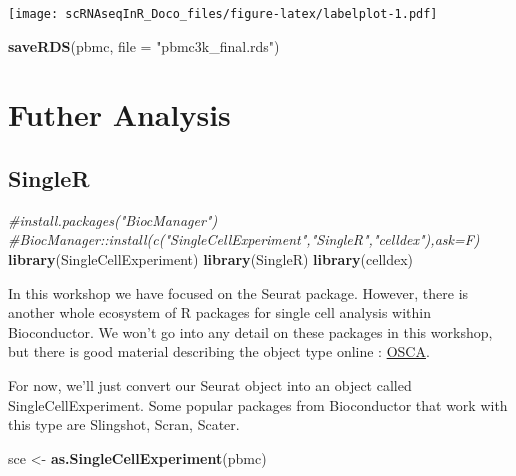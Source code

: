 \documentclass[
]{book}
\newenvironment{Shaded}{\begin{snugshade}}{\end{snugshade}}
\newcommand{\AttributeTok}[1]{\textcolor[rgb]{0.13,0.29,0.53}{#1}}
\newcommand{\CommentTok}[1]{\textcolor[rgb]{0.56,0.35,0.01}{\textit{#1}}}
\newcommand{\FunctionTok}[1]{\textcolor[rgb]{0.13,0.29,0.53}{\textbf{#1}}}
\newcommand{\NormalTok}[1]{#1}
\newcommand{\OtherTok}[1]{\textcolor[rgb]{0.56,0.35,0.01}{#1}}
\newcommand{\StringTok}[1]{\textcolor[rgb]{0.31,0.60,0.02}{#1}}
\begin{document}
\texttt{[image: scRNAseqInR\_Doco\_files/figure-latex/labelplot-1.pdf]}

\begin{Shaded}
\begin{Highlighting}[]
\FunctionTok{saveRDS}\NormalTok{(pbmc, }\AttributeTok{file =} \StringTok{"pbmc3k\_final.rds"}\NormalTok{)}
\end{Highlighting}
\end{Shaded}

\hypertarget{part-futher-analysis}{%
\part{Futher Analysis}\label{part-futher-analysis}}

\hypertarget{singler}{%
\chapter{SingleR}\label{singler}}

\begin{Shaded}
\begin{Highlighting}[]
\CommentTok{\#install.packages("BiocManager")}
\CommentTok{\#BiocManager::install(c("SingleCellExperiment","SingleR","celldex"),ask=F)}
\FunctionTok{library}\NormalTok{(SingleCellExperiment)}
\FunctionTok{library}\NormalTok{(SingleR)}
\FunctionTok{library}\NormalTok{(celldex)}
\end{Highlighting}
\end{Shaded}

In this workshop we have focused on the Seurat package. However, there is another whole ecosystem of R packages for single cell analysis within Bioconductor. We won't go into any detail on these packages in this workshop, but there is good material describing the object type online : \href{https://robertamezquita.github.io/orchestratingSingleCellAnalysis/data-infrastructure.html}{OSCA}.

For now, we'll just convert our Seurat object into an object called SingleCellExperiment. Some popular packages from Bioconductor that work with this type are Slingshot, Scran, Scater.

\begin{Shaded}
\begin{Highlighting}[]
\NormalTok{sce }\OtherTok{\textless{}{-}} \FunctionTok{as.SingleCellExperiment}\NormalTok{(pbmc)}
\end{Highlighting}
\end{Shaded}
\end{document}
